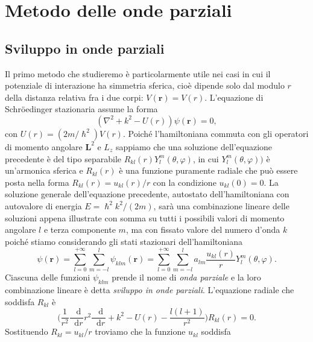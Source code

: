 \documentclass[a4paper,fleqn,twoside,12pt]{article}
\renewcommand{\phi}{\varphi}
\newcommand*{\dd}{\mathop{}\!\mathrm{d}} %
\newcommand*{\toder}[3][]{\frac{{\dd^{#1}}#2}{\dd {#3}^{#1}}}
\begin{document}
\section{Metodo delle onde parziali}
\label{sec:onde-parziali}

\subsection{Sviluppo in onde parziali}
\label{sec:sviluppo-onde}

Il primo metodo che studieremo è particolarmente utile nei casi in cui il
potenziale di interazione ha simmetria sferica, cioè dipende solo dal modulo $r$
della distanza relativa fra i due corpi: $V(\bm{r}) = V(r)$.  L'equazione di
Schröedinger stazionaria assume la forma
\begin{equation}
  (\nabla^{2} + k^{2} - U(r)) \psi(\bm{r}) = 0,
\end{equation}
con $U(r) = (2m/\hslash^{2})V(r)$.  Poiché l'hamiltoniana commuta con gli
operatori di momento angolare $\bm{L}^{2}$ e $L_{z}$ sappiamo che una soluzione
dell'equazione precedente è del tipo separabile
$R_{kl}(r)Y_{l}^{m}(\theta,\phi)$, in cui $Y_{l}^{m}(\theta,\phi))$ è
un'armonica sferica e $R_{kl}(r)$ è una funzione puramente radiale che può
essere posta nella forma $R_{kl}(r) = u_{kl}(r)/r$ con la condizione
$u_{kl}(0) = 0$.  La soluzione generale dell'equazione precedente, autostato
dell'hamiltoniana con autovalore di energia $E = \hslash^{2}k^{2}/(2m)$, sarà
una combinazione lineare delle soluzioni appena illustrate con somma su tutti i
possibili valori di momento angolare $l$ e terza componente $m$, ma con fissato
valore del numero d'onda $k$ poiché stiamo considerando gli stati stazionari
dell'hamiltoniana
\begin{equation}
  \label{eq:onde-parziali1}
  \psi(\bm{r}) = \sum_{l = 0}^{+\infty} \sum_{m = -l}^{l} \psi_{klm}(\bm{r}) =
  \sum_{l = 0}^{+\infty} \sum_{m = -l}^{l} a_{lm}
  \frac{u_{kl}(r)}{r}Y_{l}^{m}(\theta,\phi).
\end{equation}
Ciascuna delle funzioni $\psi_{klm}$ prende il nome di \emph{onda parziale} e la
loro combinazione lineare è detta \emph{sviluppo in onde parziali}.  L'equazione
radiale che soddisfa $R_{kl}$ è
\begin{equation}
  \label{eq:diff-R-op}
  \bigg(\frac{1}{r^{2}}\toder{}{r}r^{2}\toder{}{r} + k^{2} - U(r) -
  \frac{l(l+1)}{r^{2}}\bigg)R_{kl}(r) = 0.
\end{equation}
Sostituendo $R_{kl}=u_{kl}/r$ troviamo che la funzione $u_{kl}$ soddisfa
\end{document}
